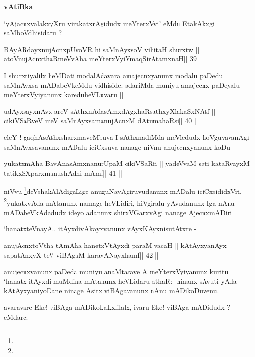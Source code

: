 \begin{center}
\textbf{vAtiRka}
\end{center}

\begin{artha}
`yAjacnxvalakxyXru virakatxrAgidudx meYterxVyi' eMdu EtakAkxgi
  saMboVdhisidaru ?
\end{artha}

\begin{shl}
BAyARdayxnujAcnxpUvoVR hi saMnAyxsoV vihitaH shurxtw ||
atoV\s nujAcnxthaRmeVvA\s\s ha meYterxVyiVmaqSirAtamxnaH\hfill || 39 ||
\end{shl}

\begin{artha}
I shurxtiyalilx heMDati modalAdavara amajecnxyanunx modalu paDedu
saMnAyxsa mADabeVkeMdu vidhiside. adariMda muniyu amajecnx paDeyalu
meYterxVyiyanunx kareduheVLuvaru ||
\end{artha}

\begin{shl}
udAyxsayxnAvx areV sAthxnAdasAmxdAgxhaRsathxyXlakaSxNAtf ||
cikiVSaRveV meV saMnAyxsamanujAcnxM dAtumahaRsi\hfill || 40 ||
\end{shl}

\begin{artha}
eleY ! gaqhAsAthxsharxmaveMbuva I sAthxnadiMda meVledudx hoVguvavanAgi
saMnAyxsavanunx mADalu iciCxsuva nanage niVnu anujecnxyanunx koDu ||
\end{artha}

\begin{shl}
yukatxmAha BavAnasAmxnanurUpaM cikiVSaRti ||
yadeVvaM sati kataRvayxM tatikxSXparxmanushAdhi mAmf\hfill || 41 ||
\end{shl}

\begin{artha}
niVvu \footnote[2]{}deVshakAlAdigaLige anuguNavAgiruvudanunx mADalu
iciCxsididxVri, \footnote[1]{}yukatxvAda mAtanunx namage heVLidiri,
hiVgiralu yAvudanunx Iga nAnu mADabeVkAdadudx ideyo adanunx
shirxVGarxvAgi nanage AjecnxmADiri ||

`hanatxteV\s nayA.. itAyxdivAkayxvanunx vAyxKAyxnisutAtxre -
\end{artha}

\begin{shl}
anujAcnxtoV\s tha tAmAha hanetxVtAyxdi paraM vacaH ||
kAtAyxyanAyx sapatAnxyX teV viBAgaM karavANayxhamf\hfill || 42 ||
\end{shl}

\begin{artha}
anujecnxyanunx paDeda muniyu anaMtarave A meYterxVyiyanunx kuritu
`hanatx itAyxdi muMdina mAtanunx heVLidaru athaR:- ninanx sAvuti yAda
kAtAyxyaniyoDane ninage Asitx viBAgavanunx nAnu mADikoDuvenu.

avaravare Eke! viBAga mADikoLaLxlilalx, ivaru Eke! viBAga mADidudx ?
eMdare:-
\end{artha}

